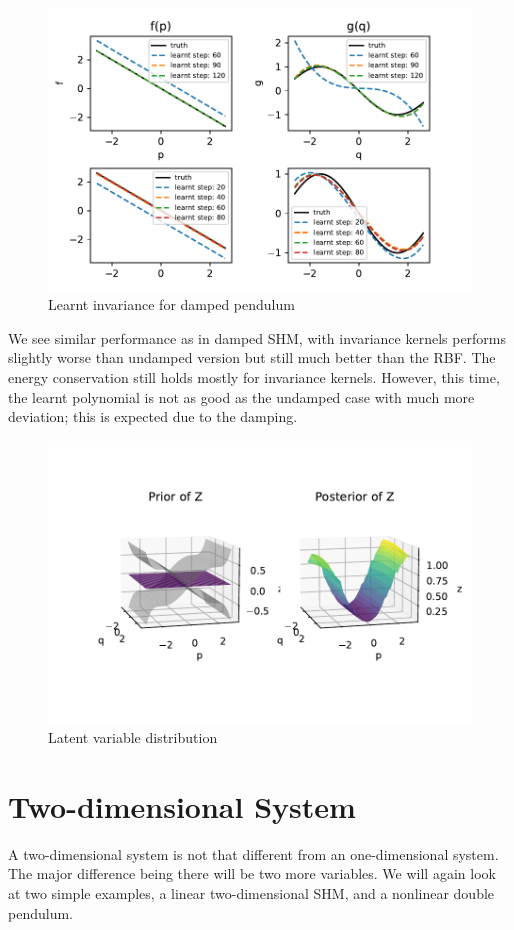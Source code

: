 \documentclass{statsmsc}
\begin{document}
\begin{figure}[H] 
  \includegraphics[width=0.8\linewidth]{../codes/figures/damped_pendulum_learnt_over_time.pdf}
  \centering
  \caption{Learnt invariance for damped pendulum}
  \label{fig:damped_pendulum_learnt}
\end{figure}

We see similar performance as in damped SHM, with invariance kernels performs slightly worse than undamped version but still much better than the RBF.
The energy conservation still holds mostly for invariance kernels.
However, this time, the learnt polynomial is not as good as the undamped case with much more deviation; this is expected due to the damping.

\begin{figure}[H] 
  \includegraphics[width=0.8\linewidth]{../codes/figures/latent_damped_pendulum.pdf}
  \centering
  \caption{Latent variable distribution}
  \label{fig:latent_damped_pendulum}
\end{figure}

\section{Two-dimensional System}
A two-dimensional system is not that different from an one-dimensional system. The major difference being there will be two more variables. 
We will again look at two simple examples, a linear two-dimensional SHM, and a nonlinear double pendulum.
\end{document}
